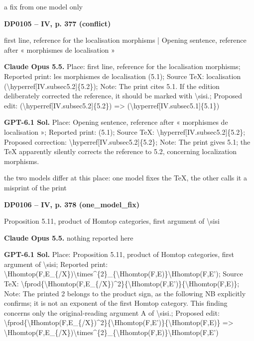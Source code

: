 a fix from one model only\par
\par\noindent\hypertarget{DP0105}{}\textbf{DP0105 -- IV, p. 377 (conflict)}\par
first line, reference for the localisation morphisms | Opening sentence, reference after « morphismes de localisation »\par
\textbf{Claude Opus 5.5.} Place: first line, reference for the localisation morphisms; Reported print: les morphismes de localisation (5.1); Source TeX: localisation (\textbackslash{}hyperref[IV.subsec5.2]\{5.2\}); Note: The print cites 5.1. If the edition deliberately corrected the reference, it should be marked with \textbackslash{}sisi.; Proposed edit: (\textbackslash{}hyperref[IV.subsec5.2]\{5.2\}) =\allowbreak > (\textbackslash{}hyperref[IV.subsec5.1]\{5.1\})\par
\textbf{GPT-6.1 Sol.} Place: Opening sentence, reference after « morphismes de localisation »; Reported print: (5.1); Source TeX: \textbackslash{}hyperref[IV.subsec5.2]\{5.2\}; Proposed correction: \textbackslash{}hyperref[IV.subsec5.2]\{5.2\}; Note: The print gives 5.1; the TeX apparently silently corrects the reference to 5.2, concerning localization morphisms.\par
the two models differ at this place: one model fixes the TeX, the other calls it a misprint of the print\par
\par\noindent\hypertarget{DP0106}{}\textbf{DP0106 -- IV, p. 378 (one\_model\_fix)}\par
Proposition 5.11, product of Homtop categories, first argument of \textbackslash{}sisi\par
\textbf{Claude Opus 5.5.} nothing reported here\par
\textbf{GPT-6.1 Sol.} Place: Proposition 5.11, product of Homtop categories, first argument of \textbackslash{}sisi; Reported print: \textbackslash{}Hhomtop(F,E\_\{/X\})\textbackslash{}times\textasciicircum{}\{2\}\_\{\textbackslash{}Hhomtop(F,E)\}\textbackslash{}Hhomtop(F,E'); Source TeX: \textbackslash{}fprod\{\textbackslash{}Hhomtop(F,E\_\{/X\})\textasciicircum{}2\}\{\textbackslash{}Hhomtop(F,E')\}\{\textbackslash{}Hhomtop(F,E)\}; Note: The printed 2 belongs to the product sign, as the following NB explicitly confirms; it is not an exponent of the first Homtop category. This finding concerns only the original-reading argument A of \textbackslash{}sisi.; Proposed edit: \textbackslash{}fprod\{\textbackslash{}Hhomtop(F,E\_\{/X\})\textasciicircum{}2\}\{\textbackslash{}Hhomtop(F,E')\}\{\textbackslash{}Hhomtop(F,E)\} =\allowbreak > \textbackslash{}Hhomtop(F,E\_\{/X\})\textbackslash{}times\textasciicircum{}\{2\}\_\{\textbackslash{}Hhomtop(F,E)\}\textbackslash{}Hhomtop(F,E')\par
